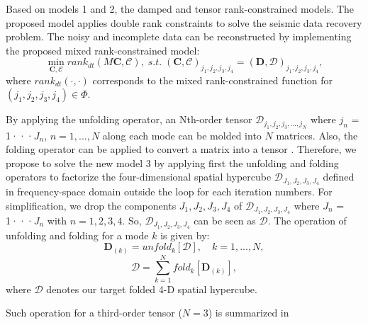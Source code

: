 Based on models 1 and 2,  the damped and tensor rank-constrained models. The proposed model applies double rank constraints to solve the seismic data recovery problem. The noisy and incomplete data can be reconstructed by implementing the proposed mixed rank-constrained model: 
\begin{equation}
\min_{\mathbf{C},\mathcal{C}}rank_{dt}(M\mathbf{C},\mathcal{C}),\; s.t.\; \left( \mathbf{C},\mathcal{C}\right)_{j_1,j_2,j_3,j_4} =\left(\mathbf{D},\mathcal{D}\right)_{j_1,j_2,j_3,j_4}, 
\end{equation}
where $rank_{dt}\left(\cdot,\cdot\right)$ corresponds to the mixed rank-constrained function for $ (j_1,j_2,j_3,j_4) \in\Phi $.

By applying the unfolding operator, an Nth-order tensor $\mathcal{D}_{j_1,j_2,j_3,...,j_N}$ where $j_n$ = 1···$J_n$, $n = 1,...,N $ along each mode can be molded into $ N $ matrices. Also, the folding operator can be applied to convert a matrix into a tensor \cite{kolda2009tensor}. Therefore, we propose to solve the new model 3 by applying first the unfolding and folding operators to factorize the four-dimensional spatial hypercube $\mathcal{D}_{J_1, J_2,J_3,J_4}$ defined in frequency-space domain outside the loop for each iteration numbers. For simplification, we drop the components {$J_1,J_2,J_3,J_4$} of $\mathcal{D}_{J_1,J_2,J_3,J_4}$ where $J_n$ = 1···$J_n$ with $n = 1,2,3,4$. So, $\mathcal{D}_{J_1,J_2,J_3,J_4}$ can be seen as $\mathcal{D}$. The operation of unfolding and folding for a mode $ k $ is given by:   
\begin{equation}
\textbf{D}_{(k)}= unfold_{k}[\mathcal{D}],\quad k=1,...,N,
\label{eq:eq4}
\end{equation}
\begin{equation}
\mathcal{D}  = \sum_{k=1}^{N} fold_{k}\left[\textbf{D}_{(k)}\right], 
\label{eq:eq5}
\end{equation}
where $\mathcal{D}$ denotes our target folded 4-D spatial hypercube.  

Such operation for a third-order tensor ($N = 3$) is summarized in 

